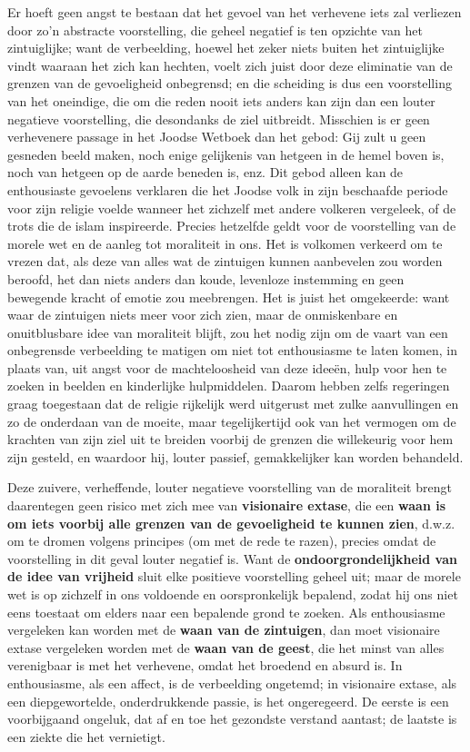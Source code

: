 Er hoeft geen angst te bestaan dat het gevoel van het verhevene iets zal verliezen door zo'n abstracte voorstelling, die geheel negatief is ten opzichte van het zintuiglijke; want de verbeelding, hoewel het zeker niets buiten het zintuiglijke vindt waaraan het zich kan hechten, voelt zich juist door deze eliminatie van de grenzen van de gevoeligheid onbegrensd; en die scheiding is dus een voorstelling van het oneindige, die om die reden nooit iets anders kan zijn dan een louter negatieve voorstelling, die desondanks de ziel uitbreidt. Misschien is er geen verhevenere passage in het Joodse Wetboek dan het gebod: Gij zult u geen gesneden beeld maken, noch enige gelijkenis van hetgeen in de hemel boven is, noch van hetgeen op de aarde beneden is, enz. Dit gebod alleen kan de enthousiaste gevoelens verklaren die het Joodse volk in zijn beschaafde periode voor zijn religie voelde wanneer het zichzelf met andere volkeren vergeleek, of de trots die de islam inspireerde. Precies hetzelfde geldt voor de voorstelling van de morele wet en de aanleg tot moraliteit in ons. Het is volkomen verkeerd om te vrezen dat, als deze van alles wat de zintuigen kunnen aanbevelen zou worden beroofd, het dan niets anders dan koude, levenloze instemming en geen bewegende kracht of emotie zou meebrengen. Het is juist het omgekeerde: want waar de zintuigen niets meer voor zich zien, maar de onmiskenbare en onuitblusbare idee van moraliteit blijft, zou het nodig zijn om de vaart van een onbegrensde verbeelding te matigen om niet tot enthousiasme te laten komen, in plaats van, uit angst voor de machteloosheid van deze ideeën, hulp voor hen te zoeken in beelden en kinderlijke hulpmiddelen. Daarom hebben zelfs regeringen graag toegestaan dat de religie rijkelijk werd uitgerust met zulke aanvullingen en zo de onderdaan van de moeite, maar tegelijkertijd ook van het vermogen om de krachten van zijn ziel uit te breiden voorbij de grenzen die willekeurig voor hem zijn gesteld, en waardoor hij, louter passief, gemakkelijker kan worden behandeld.

Deze zuivere, verheffende, louter negatieve voorstelling van de moraliteit brengt daarentegen geen risico met zich mee van \textbf{visionaire extase}, die een \textbf{waan is om iets voorbij alle grenzen van de gevoeligheid te kunnen zien}, d.w.z. om te dromen volgens principes (om met de rede te razen), precies omdat de voorstelling in dit geval louter negatief is. Want de \textbf{ondoorgrondelijkheid van de idee van vrijheid} sluit elke positieve voorstelling geheel uit; maar de morele wet is op zichzelf in ons voldoende en oorspronkelijk bepalend, zodat hij ons niet eens toestaat om elders naar een bepalende grond te zoeken. Als enthousiasme vergeleken kan worden met de \textbf{waan van de zintuigen}, dan moet visionaire extase vergeleken worden met de \textbf{waan van de geest}, die het minst van alles verenigbaar is met het verhevene, omdat het broedend en absurd is. In enthousiasme, als een affect, is de verbeelding ongetemd; in visionaire extase, als een diepgewortelde, onderdrukkende passie, is het ongeregeerd. De eerste is een voorbijgaand ongeluk, dat af en toe het gezondste verstand aantast; de laatste is een ziekte die het vernietigt.

